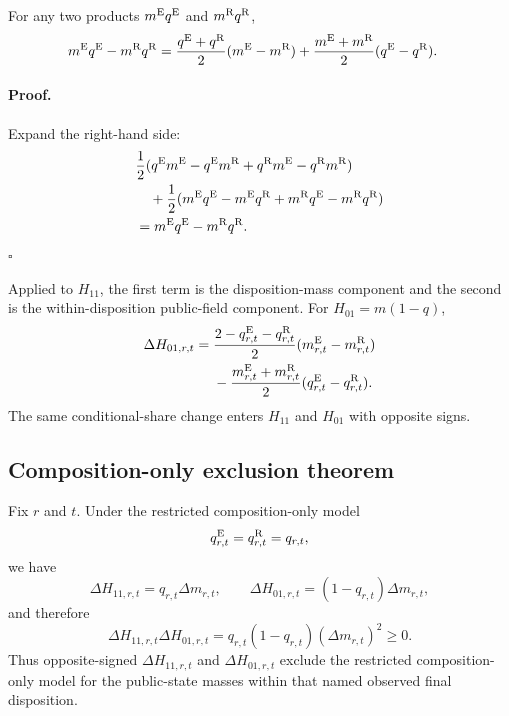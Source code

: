 \documentclass[11pt]{article}
\begin{document}
For any two products $m^{\mathrm{E}} q^{\mathrm{E}}$ and $m^{\mathrm{R}} q^{\mathrm{R}}$,
\begin{align}
m^{\mathrm{E}} q^{\mathrm{E}}-m^{\mathrm{R}} q^{\mathrm{R}}
={}&\frac{q^{\mathrm{E}}+q^{\mathrm{R}}}{2}(m^{\mathrm{E}}-m^{\mathrm{R}})
+\frac{m^{\mathrm{E}}+m^{\mathrm{R}}}{2}(q^{\mathrm{E}}-q^{\mathrm{R}}).
\label{eq:kitagawa_cell}
\end{align}

\paragraph{Proof.}
Expand the right-hand side:
\begin{align*}
&\frac{1}{2}(q^{\mathrm{E}} m^{\mathrm{E}}-q^{\mathrm{E}} m^{\mathrm{R}}+q^{\mathrm{R}} m^{\mathrm{E}}-q^{\mathrm{R}} m^{\mathrm{R}})\\
&\quad+\frac{1}{2}(m^{\mathrm{E}} q^{\mathrm{E}}-m^{\mathrm{E}} q^{\mathrm{R}}+m^{\mathrm{R}} q^{\mathrm{E}}-m^{\mathrm{R}} q^{\mathrm{R}})\\
&=m^{\mathrm{E}} q^{\mathrm{E}}-m^{\mathrm{R}} q^{\mathrm{R}}.
\end{align*}
$\square$

Applied to $H_{11}$, the first term is the disposition-mass component and the second is the within-disposition public-field component. For $H_{01}=m(1-q)$,
\begin{align}
\Delta H_{01,r,t}
={}&\frac{2-q^{\mathrm{E}}_{r,t}-q^{\mathrm{R}}_{r,t}}{2}
(m^{\mathrm{E}}_{r,t}-m^{\mathrm{R}}_{r,t})\notag\\
&-\frac{m^{\mathrm{E}}_{r,t}+m^{\mathrm{R}}_{r,t}}{2}
(q^{\mathrm{E}}_{r,t}-q^{\mathrm{R}}_{r,t}).
\label{eq:kitagawa01}
\end{align}
The same conditional-share change enters $H_{11}$ and $H_{01}$ with opposite signs.

\subsection{Composition-only exclusion theorem}

\begin{plainbox}[title=Theorem 1: composition-only sign restriction]
Fix $r$ and $t$. Under the restricted composition-only model
\begin{equation}
q^{\mathrm{E}}_{r,t}=q^{\mathrm{R}}_{r,t}=q_{r,t},
\end{equation}
we have
\begin{equation}
\Delta H_{11,r,t}=q_{r,t}\Delta m_{r,t},
\qquad
\Delta H_{01,r,t}=(1-q_{r,t})\Delta m_{r,t},
\end{equation}
and therefore
\begin{equation}
\Delta H_{11,r,t}\Delta H_{01,r,t}
=q_{r,t}(1-q_{r,t})(\Delta m_{r,t})^2\ge0.
\label{eq:signrestriction}
\end{equation}
Thus opposite-signed $\Delta H_{11,r,t}$ and $\Delta H_{01,r,t}$ exclude the restricted composition-only model for the public-state masses within that named observed final disposition.
\end{plainbox}
\end{document}
